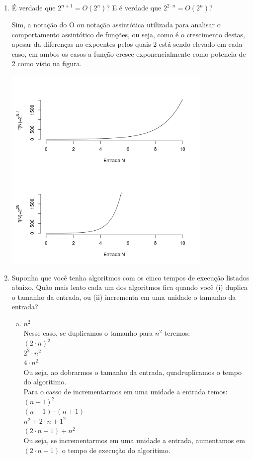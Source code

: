 \documentclass[a4paper,10pt]{article}
\begin{document}
\begin{enumerate}
 
 
\item É verdade que $2^{n+1} = O(2^n)$? E é verdade que $2^{2 \cdot n} = O(2^n)$?

Sim, a notação do O ou notação assintótica utilizada para analisar o comportamento assintótico de funções,
ou seja, como é o crescimento destas, apesar da diferenças no expoentes pelos quais 2 está sendo elevado em cada caso,
em ambos os casos a função cresce exponencialmente como potencia de 2 como visto na figura.

\includegraphics[width=10cm]{exercicio}\\

\pagebreak

\item Suponha que você tenha algoritmos com os cinco tempos de execução listados abaixo.
Quão mais lento cada um dos algoritmos fica quando você (i) duplica o tamanho da
entrada, ou (ii) incrementa em uma unidade o tamanho da entrada?

  \begin{enumerate}[(a)]
\item $n^2$\\
Nesse caso, se duplicamos o tamanho para $n^2$ teremos:\\
$(2\cdot n)^2$\\
$2^2 \cdot n^2$\\
$4 \cdot n^2$\\
Ou seja, ao dobrarmos o tamanho da entrada, quadruplicamos o tempo do algoritimo.\\
Para o casso de incrementarmos em uma unidade a entrada temos:\\
$(n+1)^2$\\
$(n+1) \cdot (n+1)$\\
$n^2+2 \cdot n+1^2$\\
$(2 \cdot n+1)+n^2$\\
Ou seja, se incrementarmos em uma unidade a entrada, aumentamos em $(2\cdot n+1)$ o tempo de execução do algoritimo.\\


\end{enumerate}
\end{enumerate}
\end{document}

